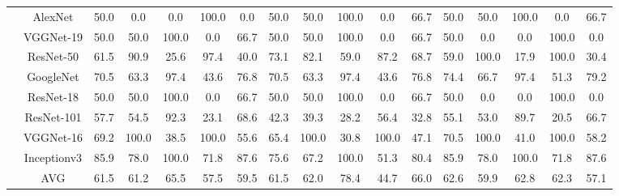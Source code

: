 \documentclass[12pt,italian]{article}
\begin{document}
\begin{tiny}
\begin{longtable}{lcccccccccccccccc}
& AlexNet & 50.0 &  0.0 &  0.0 & 100.0 &  0.0 & 50.0 & 50.0 & 100.0 &  0.0 & 66.7 & 50.0 & 50.0 & 100.0 &  0.0 & 66.7 \\ 
& VGGNet-19 & 50.0 & 50.0 & 100.0 &  0.0 & 66.7 & 50.0 & 50.0 & 100.0 &  0.0 & 66.7 & 50.0 &  0.0 &  0.0 & 100.0 &  0.0 \\ 
& ResNet-50 & 61.5 & 90.9 & 25.6 & 97.4 & 40.0 & 73.1 & 82.1 & 59.0 & 87.2 & 68.7 & 59.0 & 100.0 & 17.9 & 100.0 & 30.4 \\ 
& GoogleNet & 70.5 & 63.3 & 97.4 & 43.6 & 76.8 & 70.5 & 63.3 & 97.4 & 43.6 & 76.8 & 74.4 & 66.7 & 97.4 & 51.3 & 79.2 \\ 
& ResNet-18 & 50.0 & 50.0 & 100.0 &  0.0 & 66.7 & 50.0 & 50.0 & 100.0 &  0.0 & 66.7 & 50.0 &  0.0 &  0.0 & 100.0 &  0.0 \\ 
& ResNet-101 & 57.7 & 54.5 & 92.3 & 23.1 & 68.6 & 42.3 & 39.3 & 28.2 & 56.4 & 32.8 & 55.1 & 53.0 & 89.7 & 20.5 & 66.7 \\ 
& VGGNet-16 & 69.2 & 100.0 & 38.5 & 100.0 & 55.6 & 65.4 & 100.0 & 30.8 & 100.0 & 47.1 & 70.5 & 100.0 & 41.0 & 100.0 & 58.2 \\ 
& Inceptionv3 & 85.9 & 78.0 & 100.0 & 71.8 & 87.6 & 75.6 & 67.2 & 100.0 & 51.3 & 80.4 & 85.9 & 78.0 & 100.0 & 71.8 & 87.6 \\ 
\hline
& AVG & 61.5 & 61.2 & 65.5 & 57.5 & 59.5 & 61.5 & 62.0 & 78.4 & 44.7 & 66.0 & 62.6 & 59.9 & 62.8 & 62.3 & 57.1 \\ 
\hline
\bottomrule
\end{longtable} 

 \pagebreak 
\end{tiny} 
 
\end{document}
